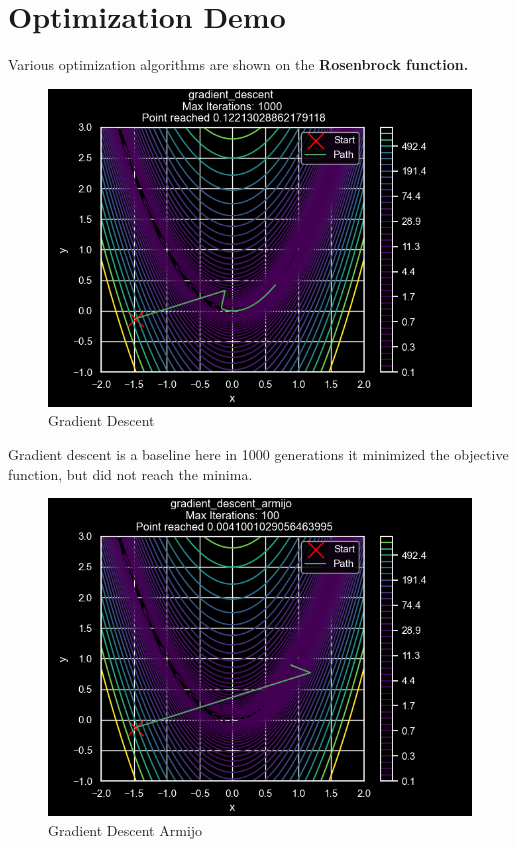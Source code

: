 \documentclass[
]{article}
\begin{document}
\section{Optimization Demo}\label{optimization-demo}

Various optimization algorithms are shown on the \textbf{Rosenbrock function.}

\begin{figure}
\centering
\includegraphics{images/gradient_descent.png}
\caption{Gradient Descent}
\end{figure}

Gradient descent is a baseline here in 1000 generations it minimized the objective function, but did not reach the minima.

\begin{figure}
\centering
\includegraphics{images/gradient_descent_armijo.png}
\caption{Gradient Descent Armijo}
\end{figure}
\end{document}
